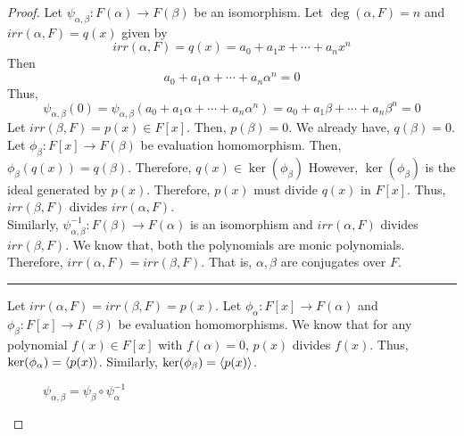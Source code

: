 \begin{proof} 
	Let $\psi_{\alpha,\beta} : F(\alpha) \to F(\beta)$ be an isomorphism.
	Let $\deg(\alpha,F) = n$ and $irr(\alpha,F) = q(x)$ given by
	\[ irr(\alpha,F) = q(x) = a_0 + a_1 x + \dotsb + a_n x^n \]
	Then 
	\[ a_0 + a_1 \alpha + \dotsb + a_n \alpha^n = 0 \]
	Thus,
	\[ \psi_{\alpha,\beta}(0) = \psi_{\alpha,\beta} (a_0 + a_1 \alpha + \dotsb + a_n \alpha^n) = a_0 + a_1 \beta + \dotsb + a_n \beta^n = 0 \]
	Let $irr(\beta,F) = p(x) \in F[x]$.
	Then, $p(\beta) = 0$.
	We already have, $q(\beta) = 0$.
	Let $\phi_\beta : F[x] \to F(\beta)$ be evaluation homomorphism.
	Then, $\phi_\beta(q(x)) = q(\beta)$.
	Therefore, $q(x) \in \ker(\phi_\beta)$
	However, $\ker(\phi_\beta)$ is the ideal generated by $p(x)$.
	Therefore, $p(x)$ must divide $q(x)$ in $F[x]$.
	Thus, $irr(\beta,F)$ divides $irr(\alpha,F)$.\\

	Similarly, $\psi_{\alpha,\beta}^{-1} : F(\beta) \to F(\alpha)$ is an isomorphism and $irr(\alpha,F)$ divides $irr(\beta,F)$.
	We know that, both the polynomials are monic polynomials.
	Therefore, $irr(\alpha,F) = irr(\beta,F)$.
	That is, $\alpha,\beta$ are conjugates over $F$.\\

	\hrule\vspace{1em}

	Let $irr(\alpha,F) = irr(\beta,F) = p(x)$.
	Let $\phi_\alpha : F[x] \to F(\alpha)$ and $\phi_\beta : F[x] \to F(\beta)$ be evaluation homomorphisms.
	We know that for any polynomial $f(x) \in F[x]$ with $f(\alpha) = 0$, $p(x)$ divides $f(x)$.
	Thus, $\ker(\phi_\alpha) = \left\langle p(x)\right\rangle$.
	Similarly, $\ker(\phi_\beta) = \left\langle p(x)\right\rangle$.\\

\begin{figure}[h]
	\centering
	\caption{$\psi_{\alpha,\beta} = \psi_\beta \circ \psi_\alpha^{-1}$}
\end{figure}


\end{proof}
